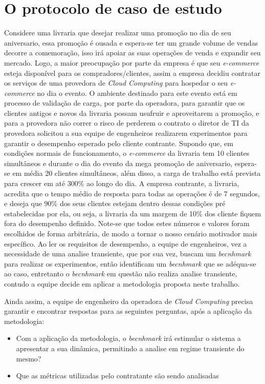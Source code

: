 \section{O protocolo de caso de estudo}
Considere uma livraria que desejar realizar uma promoção no dia de seu aniversario, essa promoção é ousada e espera-se ter um grande volume de vendas decorre a comemoração, isso irá apoiar as suas operações de venda e expandir seu mercado. Logo, a maior preocupação por parte da empresa é que seu \textit{e-commerce} esteja disponível para os compradores/clientes, assim a empresa decidiu contratar os serviços de uma provedora de \textit{Cloud Computing} para hospedar o seu \textit{e-commerce} no dia o evento. O ambiente destinado para este evento está em processo de validação de carga, por parte da operadora, para garantir que os clientes antigos e novos da livraria possam usufruir e aproveitarem a promoção, e para a provedora não correr o risco de perderem o contrato o diretor de TI da provedora solicitou a sua equipe de engenheiros realizarem experimentos para garantir o desempenho esperado pelo cliente contrante.
Supondo que, em condições normais de funcionamento, o \textit{e-commerce} da livraria tem 10 clientes simultâneos e durante o dia do evento da mega promoção de aniversario, espera-se em média 20 clientes simultâneos,  além disso, a carga de trabalho está prevista para crescer em até 300\% ao longo do dia. A empresa contrante, a livraria, acredita que o tempo médio de resposta para todas as operações é de 7 segundos, e deseja que 90\% dos seus clientes estejam dentro dessas condições pré estabelecidas por ela, ou seja, a livraria da um margem de 10\% dos cliente fiquem fora do desempenho definido. Note-se que todos estes números e valores foram escolhidos de forma arbitrária, de modo a tornar o nosso cenário motivador mais específico.
Ao ler os requisitos de desempenho, a equipe de engenheiros, vez a necessidade de uma analise transiente, que por sua vez, buscam um \textit{becnhmark} para realizar os experimentos, então identificam um \textit{becnhmark} que se adéqua-se ao caso, entretanto o \textit{becnhmark} em questão não realiza analise transiente, contudo a equipe decide em aplicar a metodologia proposta neste trabalho.

Ainda assim, a equipe de engenheiro da operadora de \textit{Cloud Computing} precisa garantir e encontrar respostas para as seguintes perguntas, após a aplicação da metodologia:

\begin{itemize}
	\item Com a aplicação da metodologia, o \textit{becnhmark} irá estimular o sistema a apresentar a sua dinâmica, permitindo a analise em regime transiente do mesmo? 
	\item Que as métricas utilizadas pelo contratante são sendo analisadas
\end{itemize}

